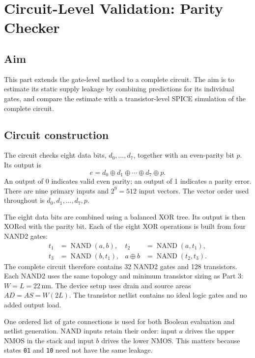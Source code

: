 \clearpage
\section{Circuit-Level Validation: Parity Checker}
\label{sec:circuit}

\subsection{Aim}
This part extends the gate-level method to a complete circuit. The aim is
to estimate its static supply leakage by combining predictions for its
individual gates, and compare the estimate with a transistor-level SPICE
simulation of the complete circuit.

\subsection{Circuit construction}
The circuit checks eight data bits, $d_0,\ldots,d_7$, together with an
even-parity bit $p$. Its output is
\begin{equation}
e=d_0\oplus d_1\oplus\cdots\oplus d_7\oplus p.
\end{equation}
An output of 0 indicates valid even parity; an output of 1 indicates a
parity error. There are nine primary inputs and $2^9=512$ input vectors.
The vector order used throughout is $d_0,d_1,\ldots,d_7,p$.

The eight data bits are combined using a balanced XOR tree. Its output is
then XORed with the parity bit. Each of the eight XOR operations is built
from four NAND2 gates:
\begin{align}
t_1&=\operatorname{NAND}(a,b), &
t_2&=\operatorname{NAND}(a,t_1),\\
t_3&=\operatorname{NAND}(b,t_1), &
a\oplus b&=\operatorname{NAND}(t_2,t_3).
\end{align}
The complete circuit therefore contains 32 NAND2 gates and 128 transistors.
Each NAND2 uses the same topology and minimum transistor sizing as Part 3:
$W=L=22$\,nm. The device setup uses drain and source
areas $AD=AS=W(2L)$. The transistor netlist contains no ideal logic gates
and no added output load.

One ordered list of gate connections is used for both Boolean evaluation
and netlist generation. NAND inputs retain their order: input $a$ drives
the upper NMOS in the stack and input $b$ drives the lower NMOS. This matters
because states \texttt{01} and \texttt{10} need not have the same leakage.

